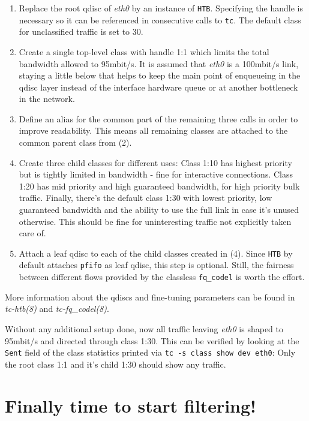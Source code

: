 \documentclass[12pt,twoside]{article}
\newcommand{\iface}{\textit}
\newcommand{\cmd}{\texttt}
\newcommand{\man}{\textit}
\newcommand{\qdisc}{\texttt}
\begin{document}
\begin{enumerate}
\item Replace the root qdisc of \iface{eth0} by an instance of \qdisc{HTB}.
  Specifying the handle is necessary so it can be referenced in consecutive
  calls to \cmd{tc}. The default class for unclassified traffic is set to
  30.
\item Create a single top-level class with handle 1:1 which limits the total
   bandwidth allowed to 95mbit/s. It is assumed that \iface{eth0} is a 100mbit/s link,
   staying a little below that helps to keep the main point of enqueueing in
   the qdisc layer instead of the interface hardware queue or at another
   bottleneck in the network.
\item Define an alias for the common part of the remaining three calls in order
   to improve readability. This means all remaining classes are attached to the
   common parent class from (2).
\item Create three child classes for different uses: Class 1:10 has highest
   priority but is tightly limited in bandwidth - fine for interactive
   connections.  Class 1:20 has mid priority and high guaranteed bandwidth, for
   high priority bulk traffic. Finally, there's the default class 1:30 with
   lowest priority, low guaranteed bandwidth and the ability to use the full
   link in case it's unused otherwise. This should be fine for uninteresting
   traffic not explicitly taken care of.
\item Attach a leaf qdisc to each of the child classes created in (4). Since
   \qdisc{HTB} by default attaches \qdisc{pfifo} as leaf qdisc, this step is optional. Still,
   the fairness between different flows provided by the classless \qdisc{fq\_codel} is
   worth the effort.
\end{enumerate}
More information about the qdiscs and fine-tuning parameters can be found in
\man{tc-htb(8)} and \man{tc-fq\_codel(8)}.

Without any additional setup done, now all traffic leaving \iface{eth0} is shaped to
95mbit/s and directed through class 1:30. This can be verified by looking at the
\texttt{Sent} field of the class statistics printed via \cmd{tc -s class show dev eth0}:
Only the root class 1:1 and it's child 1:30 should show any traffic.


\section*{Finally time to start filtering!}
\end{document}
